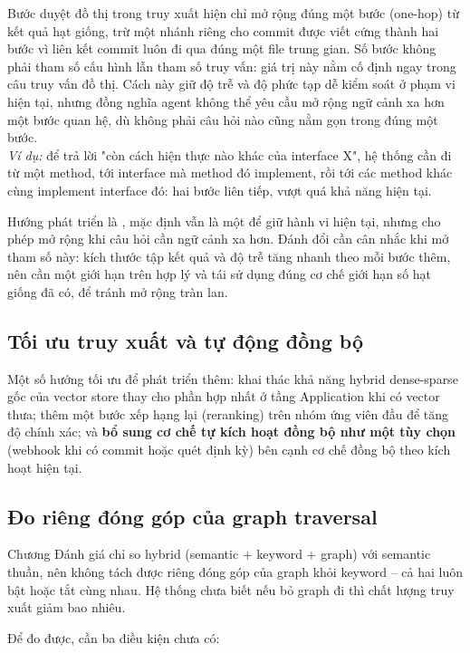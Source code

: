 Bước duyệt đồ thị trong truy xuất hiện chỉ mở rộng đúng một bước (one-hop) từ kết quả hạt giống, trừ một nhánh riêng cho commit được viết cứng thành hai bước vì liên kết commit luôn đi qua đúng một file trung gian. Số bước không phải tham số cấu hình lẫn tham số truy vấn: giá trị này nằm cố định ngay trong câu truy vấn đồ thị. Cách này giữ độ trễ và độ phức tạp dễ kiểm soát ở phạm vi hiện tại, nhưng đồng nghĩa agent không thể yêu cầu mở rộng ngữ cảnh xa hơn một bước quan hệ, dù không phải câu hỏi nào cũng nằm gọn trong đúng một bước. \\
\textit{Ví dụ:} để trả lời "còn cách hiện thực nào khác của interface X", hệ thống cần đi từ một method, tới interface mà method đó implement, rồi tới các method khác cùng implement interface đó: hai bước liên tiếp, vượt quá khả năng hiện tại.

Hướng phát triển là , mặc định vẫn là một để giữ hành vi hiện tại, nhưng cho phép mở rộng khi câu hỏi cần ngữ cảnh xa hơn. Đánh đổi cần cân nhắc khi mở tham số này: kích thước tập kết quả và độ trễ tăng nhanh theo mỗi bước thêm, nên cần một giới hạn trên hợp lý và tái sử dụng đúng cơ chế giới hạn số hạt giống đã có, để tránh mở rộng tràn lan.

\subsection{Tối ưu truy xuất và tự động đồng bộ}

Một số hướng tối ưu để phát triển thêm: khai thác khả năng hybrid dense-sparse gốc của vector store thay cho phần hợp nhất ở tầng Application khi có vector thưa; thêm một bước xếp hạng lại (reranking) trên nhóm ứng viên đầu để tăng độ chính xác; và \textbf{bổ sung cơ chế tự kích hoạt đồng bộ như một tùy chọn} (webhook khi có commit hoặc quét định kỳ) bên cạnh cơ chế đồng bộ theo kích hoạt hiện tại.

\subsection{Đo riêng đóng góp của graph traversal}

Chương Đánh giá chỉ so hybrid (semantic + keyword + graph) với semantic thuần, nên không tách được riêng đóng góp của graph khỏi keyword -- cả hai luôn bật hoặc tắt cùng nhau. Hệ thống chưa biết nếu bỏ graph đi thì chất lượng truy xuất giảm bao nhiêu.

Để đo được, cần ba điều kiện chưa có:


